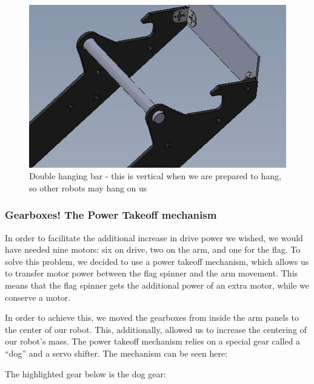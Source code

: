 \begin{figure}[H]
\begin{center}
\includegraphics[scale=0.5]{images/DoubleHangBar.png}
\end{center}
\caption{Double hanging bar - this is vertical when we are prepared to hang, so other robots may hang on us}
\end{figure}

\subsubsection{Gearboxes! The Power Takeoff mechanism}

In order to facilitate the additional increase in drive power we wished, we would have needed nine motors: six on drive, two on the arm, and one for the flag. To solve this problem, we decided to use a power takeoff mechanism, which allows us to transfer motor power between the flag spinner and the arm movement. This means that the flag spinner gets the additional power of an extra motor, while we conserve a motor.

In order to achieve this, we moved the gearboxes from inside the arm panels to the center of our robot. This, additionally, allowed us to increase the centering of our robot's mass. The power takeoff mechanism relies on a special gear called a ``dog'' and a servo shifter. The mechanism can be seen here:

The highlighted gear below is the dog gear: 

